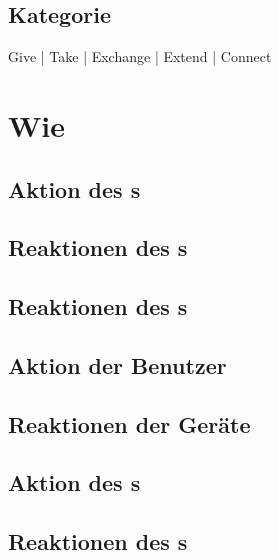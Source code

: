 \subsection*{Kategorie}
 Give   |   
 Take   |   
 Exchange   |   
 Extend   |   
 Connect

\newpage
\section*{Wie}

\ifx\swapReactions\undefined
	\ifx\usersEqual\undefined	
		\subsection*{Aktion des \sen s}
		\useraction

		\subsection*{Reaktionen des \sendev s}
		\reactionSen

		\subsection*{Reaktionen des \recdev s}
		\reactionRec
	\else
		\subsection*{Aktion der Benutzer}
		\useraction

		\subsection*{Reaktionen der Geräte}
		\reactionSen
	\fi
\else
	\subsection*{Aktion des \rec s}
	\useraction
	
	\subsection*{Reaktionen des \recdev s}
	\reactionRec
	
